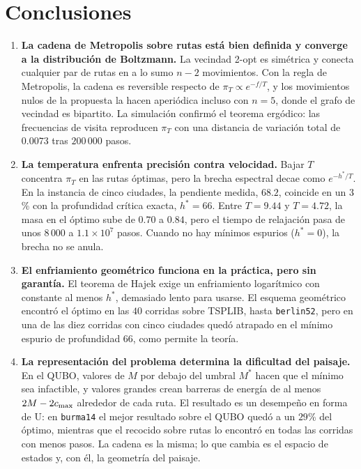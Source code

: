 
\section{Conclusiones}
\label{sec:conclusiones}

\begin{enumerate}
    \item \textbf{La cadena de Metropolis sobre rutas está bien definida
    y converge a la distribución de Boltzmann.} La vecindad 2-opt es
    simétrica y conecta cualquier par de rutas en a lo sumo \(n-2\)
    movimientos. Con la regla de Metropolis, la cadena es reversible
    respecto de \(\pi_T\propto e^{-f/T}\), y los movimientos nulos de la
    propuesta la hacen aperiódica incluso con \(n=5\), donde el grafo de
    vecindad es bipartito. La simulación confirmó el teorema ergódico:
    las frecuencias de visita reproducen \(\pi_T\) con una distancia de
    variación total de \(0.0073\) tras \(200\,000\) pasos.

    \item \textbf{La temperatura enfrenta precisión contra velocidad.}
    Bajar \(T\) concentra \(\pi_T\) en las rutas óptimas, pero la brecha
    espectral decae como \(e^{-h^\ast/T}\). En la instancia de cinco
    ciudades, la pendiente medida, \(68.2\), coincide en un \(3\)\%
    con la profundidad crítica exacta, \(h^\ast=66\). Entre
    \(T=9.44\) y \(T=4.72\), la masa en el óptimo sube de \(0.70\) a
    \(0.84\), pero el tiempo de relajación pasa de unos \(8\,000\) a
    \(1.1\times10^7\) pasos. Cuando no hay mínimos espurios
    (\(h^\ast=0\)), la brecha no se anula.

    \item \textbf{El enfriamiento geométrico funciona en la práctica,
    pero sin garantía.} El teorema de Hajek exige un enfriamiento
    logarítmico con constante al menos \(h^\ast\), demasiado lento para
    usarse. El esquema geométrico encontró el óptimo en las \(40\)
    corridas sobre TSPLIB, hasta \texttt{berlin52}, pero en una de las
    diez corridas con cinco ciudades quedó atrapado en el mínimo
    espurio de profundidad \(66\), como permite la teoría.

    \item \textbf{La representación del problema determina la dificultad
    del paisaje.} En el QUBO, valores de \(M\) por debajo del umbral
    \(M^\ast\) hacen que el mínimo sea infactible, y valores grandes
    crean barreras de energía de al menos \(2M-2c_{\max}\) alrededor de cada
    ruta. El resultado es un desempeño en forma de U: en \texttt{burma14}
    el mejor resultado sobre el QUBO quedó a un \(29\)\% del óptimo,
    mientras que el recocido sobre rutas lo encontró en todas las
    corridas con menos pasos. La cadena es la misma; lo que cambia es el
    espacio de estados y, con él, la geometría del paisaje.
\end{enumerate}

